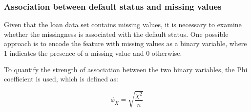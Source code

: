 \subsubsection{Association between default status and missing values}
\label{subsubsec:target-na-ass}

Given that the loan data set contains missing values, it is necessary to examine whether the missingness is associated with the default status. One possible approach is to encode the feature with missing values as a binary variable, where 1 indicates the presence of a missing value and 0 otherwise.

To quantify the strength of association between the two binary variables, the Phi coefficient is used, which is defined as:

\begin{equation}\label{eq}
\phi_{X} = \sqrt{\frac{\chi^{2}}{n}}
\end{equation}


